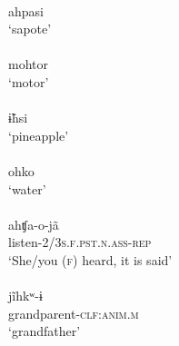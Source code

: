 \documentclass[output=paper]{langscibook}
\begin{document}
\begin{exe}
\ex\label{exe-RI-preC-h}
\begin{multicols}{2}\raggedcolumns
\begin{xlist}
\ex
\gll [ah.pa.si]\\
ahpasi\\
\trans `sapote'\\
{\citep[102]{Bruil:2014}}
\ex
{}\\
mohtor\\
\trans `motor'\\
{\citep[104]{Bruil:2014}}
\ex
\gll [\~ɨh̃.si]\\
\~ɨhsi\\
\trans `pineapple'\\
{\citep[20120919elicr005]{Bruil:2012}}
\ex
\gll [oh.ko]\\
ohko\\
\trans `water'\\
{\citep[20120912elicr007]{Bruil:2012}}
\ex
\glll [ah.ʧao.ɲã]\\
ahʧa-o-jã\\
listen-\textsc{2/3s.f.pst.n.ass-rep}\\
\trans `She/you (\textsc{f}) heard, it is said'\\
{\citep[20120918elicr003]{Bruil:2012}}
\ex
{}\\
jĩhkʷ-ɨ\\
grandparent-\textsc{clf:anim.m}\\
\trans `grandfather'\\
{\citep[214]{Bruil:2014}}
\end{xlist}
\end{multicols}


\end{exe}
\end{document}
